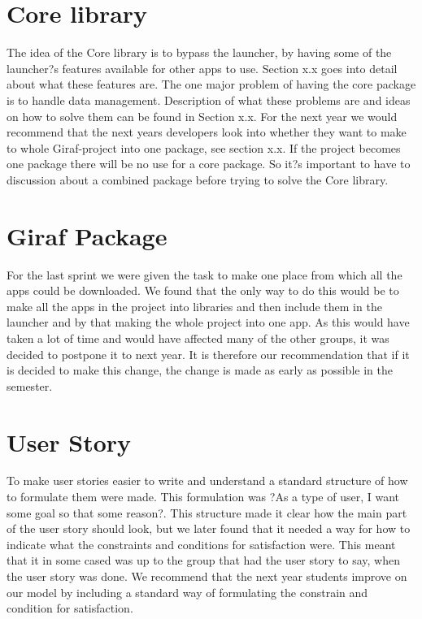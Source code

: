 \section{Core library}
The idea of the Core library is to bypass the launcher, by having some of the launcher?s features available for other apps to use. Section x.x goes into detail about what these features are. The one major problem of having the core package is to handle data management. Description of what these problems are and ideas on how to solve them can be found in Section x.x.
For the next year we would recommend that the next years developers look into whether they want to make to whole Giraf-project into one package, see section x.x. If the project becomes one package there will be no use for a core package. So it?s important to have to discussion about a combined package before trying to solve the Core library.   

\section{Giraf Package}
For the last sprint we were given the task to make one place from which all the apps could be downloaded. We found that the only way to do this would be to make all the apps in the project into libraries and then include them in the launcher and by that making the whole project into one app. As this would have taken a lot of time and would have affected many of the other groups, it was decided to postpone it to next year. It is therefore our recommendation that if it is decided to make this change, the change is made as early as possible in the semester.

\section{User Story}
To make user stories easier to write and understand a standard structure of how to formulate them were made. This formulation was ?As a {type of user}, I want {some goal} so that {some reason}?. This structure made it clear how the main part of the user story should look, but we later found that it needed a way for how to indicate what the constraints and conditions for satisfaction were. This meant that it in some cased was up to the group that had the user story to say, when the user story was done. We recommend that the next year students improve on our model by including a standard way of formulating the constrain and condition for satisfaction.

